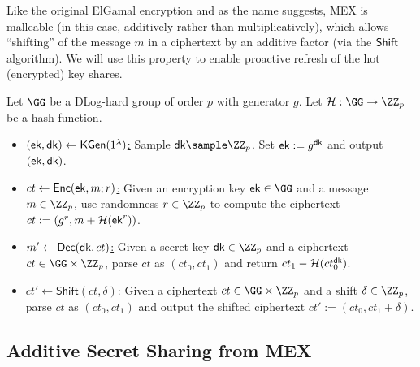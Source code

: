 Like the original ElGamal encryption and as the name suggests, MEX is malleable (in this case, additively rather than multiplicatively), which allows ``shifting'' of the message $m$ in a ciphertext by an additive factor (via the $\sf Shift$ algorithm). We will use this property to enable proactive refresh of the hot (encrypted) key shares.

\begin{construction}[\mex]\label{con:enc}
Let $\GG$ be a DLog-hard group of order $p$ with generator $g$. 
Let $\lhlhash: \GG \rightarrow \ZZ_p$ be a hash function. 
\begin{itemize}
\item \underline{$(\mathsf{ek}, \mathsf{dk}) \gets \mathsf{KGen}(1^\lambda)$:}
Sample $\dk \sample \ZZ_p$. Set $\mathsf{ek} := g^{\mathsf{dk}}$ and output $(\mathsf{ek}, \mathsf{dk})$.

\item \underline{$ct \gets \mathsf{Enc}(\mathsf{ek}, m; r)$:}
Given an encryption key $\ek \in \GG$ and a message $m \in \ZZ_p$, use randomness $r \in \ZZ_p$ to compute the ciphertext $ct := (g^r, m + \mathcal{H}(\mathsf{ek}^r))$.

\item \underline{$m' \gets \mathsf{Dec}(\mathsf{dk}, ct)$:}
Given a secret key $\dk \in \ZZ_p$ and a ciphertext $ct \in \GG \times\ZZ_p$, parse $ct$ as $(ct_0, ct_1)$ and return $ct_1 - \mathcal{H}(ct_0^{\mathsf{dk}})$.

\item \underline{$ct' \gets \mathsf{Shift}(ct, \delta)$:}
Given a ciphertext $ct \in \GG \times \ZZ_p$ and a shift $\delta \in \ZZ_p$, parse $ct$ as $(ct_0, ct_1)$ and output the shifted ciphertext $ct' := (ct_0, ct_1 + \delta)$.
\end{itemize}
\end{construction}

\subsection{Additive Secret Sharing from MEX}

